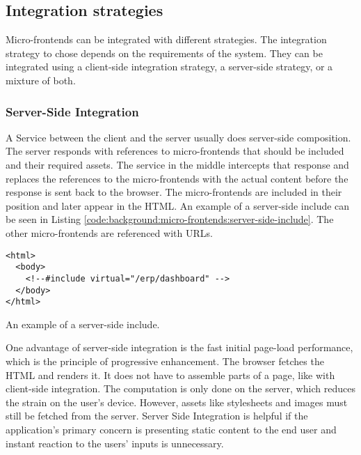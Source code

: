 \subsection{Integration strategies}\label{subsection:background:micro-frontend-architecture:integration-strategies}

Micro-frontends can be integrated with different strategies. The integration strategy to chose depends on the requirements of the system. They can be integrated using a client-side integration strategy, a server-side strategy, or a mixture of both.

\subsubsection{Server-Side Integration}\label{subsubsection:background:micro-frontend-architecture:integration-strategies:server-side-integration}

A Service between the client and the server usually does server-side composition. \cite[60]{book:2020:geers:background:micro-frontends:micro-frontends-in-action} The server responds with references to micro-frontends that should be included and their required assets. The service in the middle intercepts that response and replaces the references to the micro-frontends with the actual content before the response is sent back to the browser. The micro-frontends are included in their position and later appear in the \ac{HTML}. An example of a server-side include can be seen in Listing \ref{code:background:micro-frontends:server-side-include}. The other micro-frontends are referenced with \acp{URL}. \cite[61-63]{book:2020:geers:background:micro-frontends:micro-frontends-in-action}

\ifshowListings
\begin{listing}[H]
    \begin{verbatim}
<html>
  <body>
    <!--#include virtual="/erp/dashboard" -->
  </body>
</html>
    \end{verbatim}
    \caption{An example of a server-side include.}\label{code:background:micro-frontends:server-side-include}
\end{listing}
\fi

\bigskip

\noindent One advantage of server-side integration is the fast initial page-load performance, which is the principle of progressive enhancement. \cite{book:2010:parker:background:micro-frontends:designing-with-progressive-enhancement} The browser fetches the \ac{HTML} and renders it. It does not have to assemble parts of a page, like with client-side integration. The computation is only done on the server, which reduces the strain on the user's device. \cite{book:2020:geers:background:micro-frontends:micro-frontends-in-action} However, assets like stylesheets and images must still be fetched from the server. Server Side Integration is helpful if the application's primary concern is presenting static content to the end user and instant reaction to the users' inputs is unnecessary.  \cite[83]{book:2020:geers:background:micro-frontends:micro-frontends-in-action}

